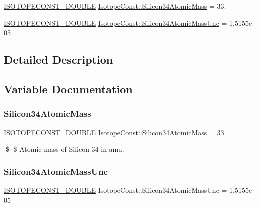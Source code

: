 \begin{DoxyCompactItemize}
\item 
\mbox{\hyperlink{group___isotope_const-_macros_ga8f45a7272ce02c0b4c65c44636ed719a}{I\+S\+O\+T\+O\+P\+E\+C\+O\+N\+S\+T\+\_\+\+D\+O\+U\+B\+LE}} \mbox{\hyperlink{group___isotope_const-_silicon-_si34_ga4a6c642f24370c9a80beff5031a79031}{Isotope\+Const\+::\+Silicon34\+Atomic\+Mass}} = 33.
\item 
\mbox{\hyperlink{group___isotope_const-_macros_ga8f45a7272ce02c0b4c65c44636ed719a}{I\+S\+O\+T\+O\+P\+E\+C\+O\+N\+S\+T\+\_\+\+D\+O\+U\+B\+LE}} \mbox{\hyperlink{group___isotope_const-_silicon-_si34_ga4645d8c96e8b6d0bc85a4125eede0b03}{Isotope\+Const\+::\+Silicon34\+Atomic\+Mass\+Unc}} = 1.\+5155e-\/05
\end{DoxyCompactItemize}


\subsection{Detailed Description}


\subsection{Variable Documentation}
\mbox{\label{group___isotope_const-_silicon-_si34_ga4a6c642f24370c9a80beff5031a79031}} 
\subsubsection{\texorpdfstring{Silicon34\+Atomic\+Mass}{Silicon34AtomicMass}}
{\footnotesize\ttfamily \mbox{\hyperlink{group___isotope_const-_macros_ga8f45a7272ce02c0b4c65c44636ed719a}{I\+S\+O\+T\+O\+P\+E\+C\+O\+N\+S\+T\+\_\+\+D\+O\+U\+B\+LE}} Isotope\+Const\+::\+Silicon34\+Atomic\+Mass = 33.}

\$ \$ Atomic mass of Silicon-\/34 in amu. \mbox{\label{group___isotope_const-_silicon-_si34_ga4645d8c96e8b6d0bc85a4125eede0b03}} 
\subsubsection{\texorpdfstring{Silicon34\+Atomic\+Mass\+Unc}{Silicon34AtomicMassUnc}}
{\footnotesize\ttfamily \mbox{\hyperlink{group___isotope_const-_macros_ga8f45a7272ce02c0b4c65c44636ed719a}{I\+S\+O\+T\+O\+P\+E\+C\+O\+N\+S\+T\+\_\+\+D\+O\+U\+B\+LE}} Isotope\+Const\+::\+Silicon34\+Atomic\+Mass\+Unc = 1.\+5155e-\/05}

